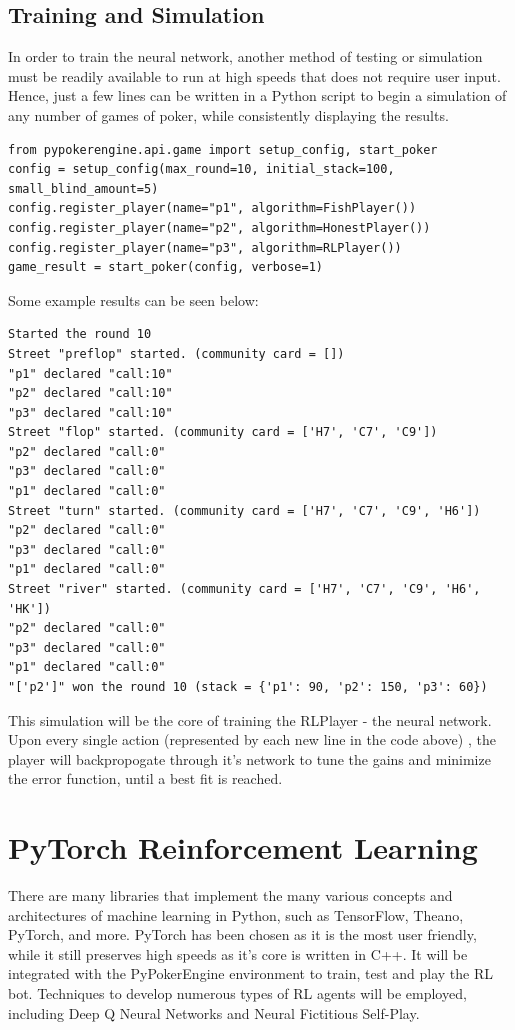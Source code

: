 \documentclass[12pt]{article}
\begin{document}
\subsection{Training and Simulation}
In order to train the neural network, another method of testing or simulation must be readily available to run at high speeds that does not require user input. Hence, just a few lines can be written in a Python script to begin a simulation of any number of games of poker, while consistently displaying the results.
\begin{verbatim}
from pypokerengine.api.game import setup_config, start_poker
config = setup_config(max_round=10, initial_stack=100, small_blind_amount=5)
config.register_player(name="p1", algorithm=FishPlayer())
config.register_player(name="p2", algorithm=HonestPlayer())
config.register_player(name="p3", algorithm=RLPlayer())
game_result = start_poker(config, verbose=1)
\end{verbatim}
Some example results can be seen below:
\begin{verbatim}
Started the round 10
Street "preflop" started. (community card = [])
"p1" declared "call:10"
"p2" declared "call:10"
"p3" declared "call:10"
Street "flop" started. (community card = ['H7', 'C7', 'C9'])
"p2" declared "call:0"
"p3" declared "call:0"
"p1" declared "call:0"
Street "turn" started. (community card = ['H7', 'C7', 'C9', 'H6'])
"p2" declared "call:0"
"p3" declared "call:0"
"p1" declared "call:0"
Street "river" started. (community card = ['H7', 'C7', 'C9', 'H6', 'HK'])
"p2" declared "call:0"
"p3" declared "call:0"
"p1" declared "call:0"
"['p2']" won the round 10 (stack = {'p1': 90, 'p2': 150, 'p3': 60})
\end{verbatim}
This simulation will be the core of training the RLPlayer - the neural network. Upon every single action (represented by each new line in the code above) , the player will backpropogate through it's network to tune the gains and minimize the error function, until a best fit is reached.

\section{PyTorch Reinforcement Learning}
There are many libraries that implement the many various concepts and architectures of machine learning in Python, such as TensorFlow, Theano, PyTorch, and more. PyTorch has been chosen as it is the most user friendly, while it still preserves high speeds as it's core is written in C++. It will be integrated with the PyPokerEngine environment to train, test and play the RL bot. Techniques to develop numerous types of RL agents will be employed, including Deep Q Neural Networks and Neural Fictitious Self-Play.
\end{document}
